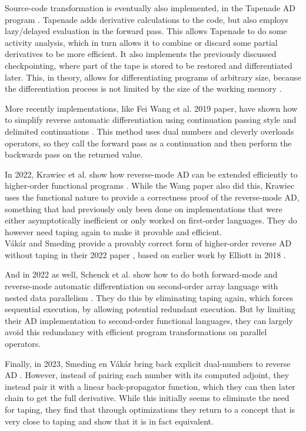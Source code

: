         Source-code transformation is eventually also implemented, in the Tapenade AD program \cite{hascoet2013tapenade}.
        Tapenade adds derivative calculations to the code, but also employs lazy/delayed evaluation in the forward pass.
        This allows Tapenade to do some activity analysis, which in turn allows it to combine or discard some partial derivatives to be more efficient.
        It also implements the previously discussed checkpointing, where part of the tape is stored to be restored and differentiated later.
        This, in theory, allows for differentiating programs of arbitrary size, because the differentiation process is not limited by the size of the working memory \cite{griewank2008evaluating}.

        More recently implementations, like Fei Wang et al. 2019 paper, have shown how to simplify reverse automatic differentiation using continuation passing style and delimited continuations \cite{wang2019demystifying}.
        This method uses dual numbers and cleverly overloads operators, so they call the forward pass as a continuation and then perform the backwards pass on the returned value.

        In 2022, Krawiec et al. show how reverse-mode AD can be extended efficiently to higher-order functional programs \cite{krawiec2022provably}.
        While the Wang paper also did this, Krawiec uses the functional nature to provide a correctness proof of the reverse-mode AD, something that had previously only been done on implementations that were either asymptotically inefficient or only worked on first-order languages.
        They do however need taping again to make it provable and efficient.\\
        Vákár and Smeding provide a provably correct form of higher-order reverse AD without taping in their 2022 paper \cite{vakar2022chad}, based on earlier work by Elliott in 2018 \cite{elliott2018simple}.

        And in 2022 as well, Schenck et al. show how to do both forward-mode and reverse-mode automatic differentiation on second-order array language with nested data parallelism \cite{schenck2022ad}.
        They do this by eliminating taping again, which forces sequential execution, by allowing potential redundant execution.
        But by limiting their AD implementation to second-order functional languages, they can largely avoid this redundancy with efficient program transformations on parallel operators.

        Finally, in 2023, Smeding en Vákár bring back explicit dual-numbers to reverse AD \cite{smeding2023efficient}.
        However, instead of pairing each number with its computed adjoint, they instead pair it with a linear back-propagator function, which they can then later chain to get the full derivative.
        While this initially seems to eliminate the need for taping, they find that through optimizations they return to a concept that is very close to taping and show that it is in fact equivalent.


